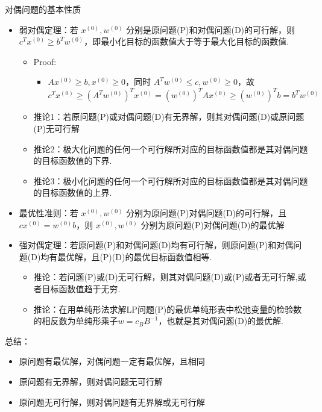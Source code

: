 \begin{remark}
    对偶问题的基本性质
    \begin{itemize}
        \item 弱对偶定理：若 $x^{(0)}, w^{(0)}$ 分别是原问题(P)和对偶问题(D)的可行解，则 $c^Tx^{(0)} \ge b^Tw^{(0)}$，即最小化目标的函数值大于等于最大化目标的函数值.\begin{itemize}
            \item Proof:\begin{itemize}
                \item $Ax^{(0)} \ge b, x^{(0)} \ge 0$，同时 $A^Tw^{(0)} \le c, w^{(0)} \ge 0$，故 $c^Tx^{(0)} \ge (A^Tw^{(0)})^Tx^{(0)} = (w^{(0)})^TAx^{(0)} \ge (w^{(0)})^Tb = b^Tw^{(0)}$
            \end{itemize}
            \item 推论1：若原问题(P)或对偶问题(D)有无界解，则其对偶问题(D)或原问题(P)无可行解
            \item 推论2：极大化问题的任何一个可行解所对应的目标函数值都是其对偶问题的目标函数值的下界.
            \item 推论3：极小化问题的任何一个可行解所对应的目标函数值都是其对偶问题的目标函数值的上界.
        \end{itemize}
        \item 最优性准则：若 $x^{(0)}, w^{(0)}$ 分别为原问题(P)对偶问题(D)的可行解，且 $cx^{(0)} = w^{(0)}b$，则 $x^{(0)}, w^{(0)}$ 分别为原问题(P)对偶问题(D)的最优解
        \item 强对偶定理：若原问题(P)和对偶问题(D)均有可行解，则原问题(P)和对偶问题(D)均有最优解，且(P)(D)的最优目标函数值相等.\begin{itemize}
            \item 推论：若问题(P)或(D)无可行解，则其对偶问题(D)或(P)或者无可行解,或者目标函数值趋于无穷.
            \item 推论：在用单纯形法求解LP问题(P)的最优单纯形表中松弛变量的检验数的相反数为单纯形乘子$w = c_BB^{-1}$，也就是其对偶问题(D)的最优解.
        \end{itemize}
    \end{itemize}
\end{remark}

\begin{remark}
    总结：
    \begin{itemize}
        \item 原问题有最优解，对偶问题一定有最优解，且相同
        \item 原问题有无界解，则对偶问题无可行解
        \item 原问题无可行解，则对偶问题有无界解或无可行解
    \end{itemize}
\end{remark}

